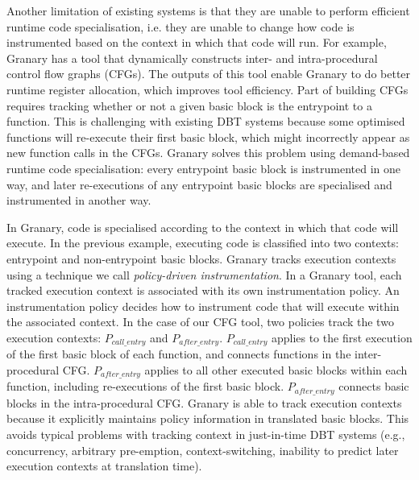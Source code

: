 \documentclass[preprint]{sigplanconf}
\begin{document}
Another limitation of existing systems is that they are unable to perform efficient runtime code specialisation, i.e. they are unable to change how code is instrumented based on the context in which that code will run. For example, Granary has a tool that  dynamically constructs inter- and intra-procedural control flow graphs (CFGs). The outputs of this tool enable Granary to do better runtime register allocation, which improves tool efficiency. Part of building CFGs requires tracking whether or not a given basic block is the entrypoint to a function. This is challenging with existing DBT systems because some optimised functions will re-execute their first basic block, which might incorrectly appear as new function calls in the CFGs. Granary solves this problem using demand-based runtime code specialisation: every entrypoint basic block is instrumented in one way, and later re-executions of any entrypoint basic blocks are specialised and instrumented in another way.


In Granary, code is specialised according to the context in which that code will execute. In the previous example, executing code is classified into two contexts: entrypoint and non-entrypoint basic blocks. Granary tracks execution contexts using a technique we call \emph{policy-driven instrumentation}. In a Granary tool, each tracked execution context is associated with its own instrumentation policy. An instrumentation policy decides how to instrument code that will execute within the associated context. In the case of our CFG tool, two policies track the two execution contexts: $P_{\mathit{call\_entry}}$ and $P_{\mathit{after\_entry}}$. $P_{\mathit{call\_entry}}$ applies to the first execution of the first basic block of each function, and connects functions in the inter-procedural CFG.  $P_{\mathit{after\_entry}}$ applies to all other executed basic blocks within each function, including re-executions of the first basic block. $P_{\mathit{after\_entry}}$ connects basic blocks in the intra-procedural CFG. Granary is able to track execution contexts because it explicitly maintains policy information in translated basic blocks. This avoids typical problems with tracking context in just-in-time DBT systems (e.g., concurrency, arbitrary pre-emption, context-switch\-ing, inability to predict later execution contexts at translation time).
\end{document}
